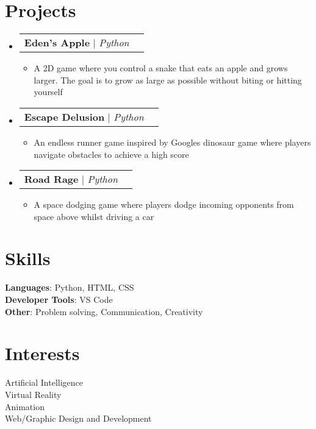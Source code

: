 \documentclass[letterpaper,11pt]{article}
\makeatletter
\newcommand{\resumeItem}[1]{
  \item\small{
    {#1 \vspace{-2pt}}
  }
}
\newcommand{\resumeProjectHeading}[2]{
    \item
    \begin{tabular*}{0.97\textwidth}{l@{\extracolsep{\fill}}r}
      \small#1 & #2 \\
    \end{tabular*}\vspace{-7pt}
}
\newcommand{\resumeSubHeadingListStart}{\begin{itemize}[leftmargin=0.15in, label={}]}
\newcommand{\resumeSubHeadingListEnd}{\end{itemize}}
\newcommand{\resumeItemListStart}{\begin{itemize}}
\newcommand{\resumeItemListEnd}{\end{itemize}\vspace{-5pt}}
\makeatother
\begin{document}
\section{Projects}
    \resumeSubHeadingListStart
      \resumeProjectHeading
          {\textbf{Eden’s Apple} $|$ \emph{Python}}{}
          \resumeItemListStart
            \resumeItem{A 2D game where you control a snake that eats an apple and grows larger. The goal is to grow as large as possible without biting or hitting yourself}
          \resumeItemListEnd
      \resumeProjectHeading
          {\textbf{Escape Delusion} $|$ \emph{Python}}{}
          \resumeItemListStart
            \resumeItem{An endless runner game inspired by Googles dinosaur game where players navigate obstacles to achieve a high score}
          \resumeItemListEnd
      \resumeProjectHeading
          {\textbf{Road Rage} $|$ \emph{Python}}{}
          \resumeItemListStart
            \resumeItem{A space dodging game where players dodge incoming opponents from space above whilst driving a car}
          \resumeItemListEnd
    \resumeSubHeadingListEnd



\section{Skills}
 \begin{itemize}[leftmargin=0.15in, label={}]
    \small{\item{
      \textbf{Languages}{: Python, HTML, CSS} \\
      \textbf{Developer Tools}{: VS Code} \\
      \textbf{Other}{: Problem solving, Communication, Creativity} \\
    }}
 \end{itemize}

\section{Interests}
 \begin{itemize}[leftmargin=0.15in, label={}]
  \small{\item{
    {Artificial Intelligence} \\
    {Virtual Reality} \\
    {Animation} \\
    {Web/Graphic Design and Development}  \\
    }}
 \end{itemize}


\end{document}
